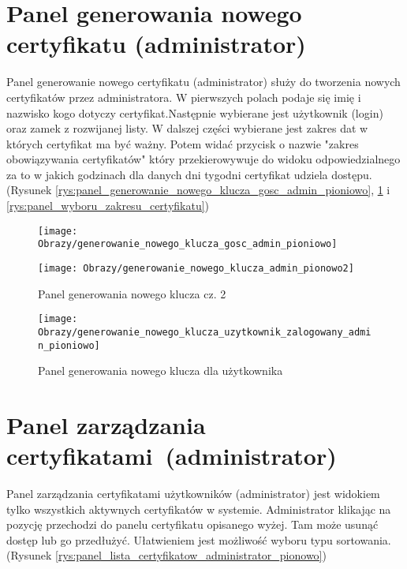 	\section*{Panel generowania nowego certyfikatu (administrator)}
	Panel generowanie nowego certyfikatu (administrator) służy do tworzenia nowych certyfikatów przez administratora. W pierwszych polach podaje się imię i nazwisko kogo dotyczy certyfikat.Następnie wybierane jest użytkownik (login) oraz zamek z rozwijanej listy. W dalszej części wybierane jest zakres dat w których certyfikat ma być ważny. Potem widać przycisk o nazwie "zakres obowiązywania certyfikatów" który przekierowywuje do widoku odpowiedzialnego za to w jakich godzinach dla danych dni tygodni certyfikat udziela dostępu. (Rysunek \ref{rys:panel_generowanie_nowego_klucza_gosc_admin_pioniowo}, \ref{rys:panel_generowanie_nowego_klucza_admin_pionowo2} i 
	\ref{rys:panel_wyboru_zakresu_certyfikatu})
	
	\begin{figure}[ht!]
		\vspace{-0.5cm}
		\begin{minipage}{0.5\textwidth}
			\texttt{[image: Obrazy/generowanie\_nowego\_klucza\_gosc\_admin\_pioniowo]}
			\caption{Panel generowania nowego klucza cz. 1 }
			\label{rys:panel_generowanie_nowego_klucza_gosc_admin_pioniowo}
		\end{minipage}
		\hspace{0.5cm}
		\begin{minipage}{0.5\textwidth}
			\texttt{[image: Obrazy/generowanie\_nowego\_klucza\_admin\_pionowo2]}
			\caption{Panel generowania nowego klucza cz. 2}
			\label{rys:panel_generowanie_nowego_klucza_admin_pionowo2}	
		\end{minipage}
	\end{figure}
	\vspace{-0.5cm}
	\begin{figure}[ht!]
		\center
			\texttt{[image: Obrazy/generowanie\_nowego\_klucza\_uzytkownik\_zalogowany\_admin\_pioniowo]}
			\caption{Panel generowania nowego klucza dla użytkownika }
			\label{rys:panel_generowanie_nowego_klucza_uzytkownik_zalogowany_admin_pioniowo}
	\end{figure}

	
	\section*{Panel zarządzania certyfikatami~(administrator)}
	Panel zarządzania certyfikatami użytkowników (administrator) jest widokiem tylko wszystkich aktywnych certyfikatów w systemie. Administrator klikając na pozycję przechodzi do panelu certyfikatu opisanego wyżej. Tam może usunąć dostęp lub go przedłużyć. Ułatwieniem jest możliwość wyboru typu sortowania. (Rysunek \ref{rys:panel_lista_certyfikatow_administrator_pionowo})
	
